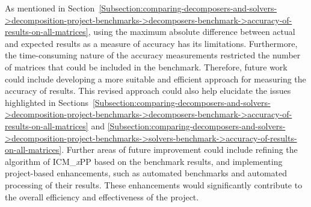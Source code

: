 As mentioned in Section~\ref{Subsection:comparing-decomposers-and-solvers->decomposition-project-benchmarks->decomposers-benchmark->accuracy-of-results-on-all-matrices}, using the maximum absolute difference between actual and expected results as a measure of accuracy has its limitations.
Furthermore, the time-consuming nature of the accuracy measurements restricted the number of matrices that could be included in the benchmark.
Therefore, future work could include developing a more suitable and efficient approach for measuring the accuracy of results.
This revised approach could also help elucidate the issues highlighted in Sections~\ref{Subsection:comparing-decomposers-and-solvers->decomposition-project-benchmarks->decomposers-benchmark->accuracy-of-results-on-all-matrices} and \ref{Subsection:comparing-decomposers-and-solvers->decomposition-project-benchmarks->solvers-benchmark->accuracy-of-results-on-all-matrices}.
Further areas of future improvement could include refining the algorithm of ICM\_\textit{x}PP based on the benchmark results, and implementing project-based enhancements, such as automated benchmarks and automated processing of their results.
These enhancements would significantly contribute to the overall efficiency and effectiveness of the project.